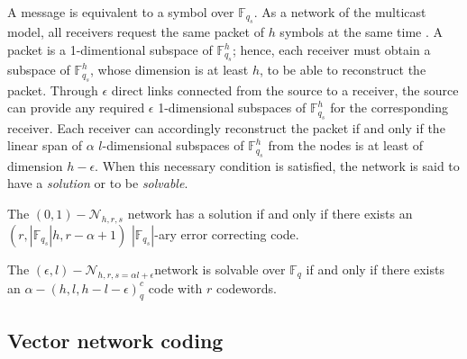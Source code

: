 A message is equivalent to a symbol over $\ensuremath{\mathbb{F}}_{q_{s}}$.
As a network of the multicast model, all receivers request the same
packet of $h$ symbols at the same time \cite{Trautmann:2013}. A
packet is a 1-dimentional subspace of $\ensuremath{\mathbb{F}}_{q_{s}}^{h}$;
hence, each receiver must obtain a subspace of $\ensuremath{\mathbb{F}}_{q_{s}}^{h}$,
whose dimension is at least $h$, to be able to reconstruct the packet.
Through $\epsilon$ direct links connected from the source to a receiver,
the source can provide any required $\epsilon$ 1-dimensional subspaces
of $\ensuremath{\mathbb{F}}_{q_{s}}^{h}$ for the corresponding receiver.
Each receiver can accordingly reconstruct the packet if and only if
the linear span of $\alpha$ $l$-dimensional subspaces of $\ensuremath{\mathbb{F}}_{q_{s}}^{h}$
from the nodes is at least of dimension $h-\epsilon$. When this necessary
condition is satisfied, the network is said to have a \textit{solution}
or to be \textit{solvable}.
\begin{thm}
The $(0,1)-\mathcal{N}_{h,r,s}$ network has a solution if and only
if there exists an $\left(r,\left|\ensuremath{\mathbb{F}}_{q_{s}}\right|h,r-\alpha+1\right)$
$\left|\ensuremath{\mathbb{F}}_{q_{s}}\right|$-ary error correcting
code. \cite{Riis:2006}
\end{thm}
%
\begin{thm}
The $(\epsilon,l)-\mathcal{N}_{h,r,s=\alpha l+\epsilon}$network is
solvable over $\ensuremath{\mathbb{F}}_{q}$ if and only if there
exists an $\alpha-\left(h,l,h-l-\epsilon\right)_{q}^{c}$ code with
$r$ codewords. \cite{Zhang:2019} \label{theo:scalar_sol_exist}
\end{thm}

\subsection{Vector network coding \label{subsec:Vector-network-coding}}


